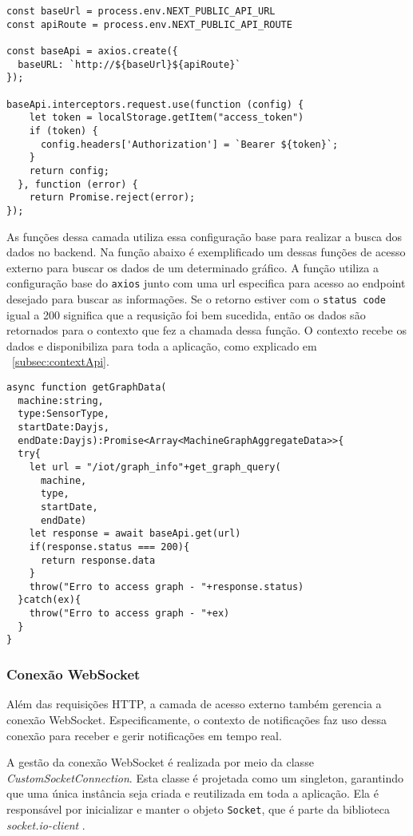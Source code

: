 \begin{verbatim}
const baseUrl = process.env.NEXT_PUBLIC_API_URL
const apiRoute = process.env.NEXT_PUBLIC_API_ROUTE

const baseApi = axios.create({
  baseURL: `http://${baseUrl}${apiRoute}`
});

baseApi.interceptors.request.use(function (config) {
    let token = localStorage.getItem("access_token")
    if (token) {
      config.headers['Authorization'] = `Bearer ${token}`;
    }
    return config;
  }, function (error) {
    return Promise.reject(error);
});
\end{verbatim}

As funções dessa camada utiliza essa configuração base para realizar a busca dos dados no backend. Na função abaixo é exemplificado um dessas funções de acesso externo para buscar os dados de um determinado gráfico. A função utiliza a configuração base do \texttt{axios} junto com uma url especifica para acesso ao endpoint desejado para buscar as informações. Se o retorno estiver com o \texttt{status code} igual a 200 significa que a requsição foi bem sucedida, então os dados são retornados para o contexto que fez a chamada dessa função. O contexto recebe os dados e disponibiliza para toda a aplicação, como explicado em ~\ref{subsec:contextApi}.

\begin{verbatim}
async function getGraphData(
  machine:string,
  type:SensorType,
  startDate:Dayjs,
  endDate:Dayjs):Promise<Array<MachineGraphAggregateData>>{
  try{
    let url = "/iot/graph_info"+get_graph_query(
      machine,
      type,
      startDate,
      endDate)
    let response = await baseApi.get(url)
    if(response.status === 200){
      return response.data
    }
    throw("Erro to access graph - "+response.status)
  }catch(ex){
    throw("Erro to access graph - "+ex)
  }
}
\end{verbatim}


\subsubsection{Conexão WebSocket}\label{subsec:websocketConncetion}
Além das requisições \gls{HTTP}, a camada de acesso externo também gerencia a conexão WebSocket. Especificamente, o contexto de notificações faz uso dessa conexão para receber e gerir notificações em tempo real.

A gestão da conexão WebSocket é realizada por meio da classe \textit{CustomSocketConnection}. Esta classe é projetada como um singleton, garantindo que uma única instância seja criada e reutilizada em toda a aplicação. Ela é responsável por inicializar e manter o objeto \texttt{Socket}, que é parte da biblioteca \textit{socket.io-client} \cite{socketIoClientApi}.

